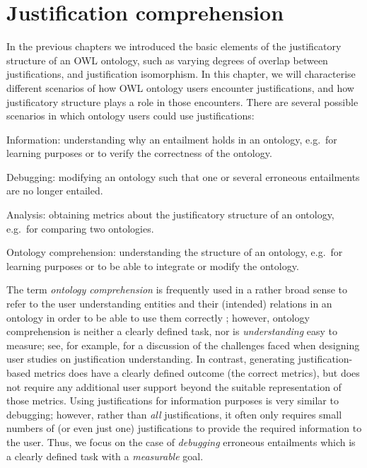 \chapter{Justification comprehension}
\label{chap:understanding}

In the previous chapters we introduced the basic elements of the justificatory structure of an OWL ontology, such as varying degrees of overlap between justifications, and justification isomorphism. In this chapter, we will characterise different scenarios of how OWL ontology users encounter justifications, and how justificatory structure plays a role in those encounters. There are several possible scenarios in which ontology users could use justifications:
\begin{compactitem}
\item Information: understanding why an entailment holds in an ontology, e.g.\ for learning purposes or to verify the correctness of the ontology.
\item Debugging: modifying an ontology such that one or several erroneous entailments are no longer entailed. 
\item Analysis: obtaining metrics about the justificatory structure of an ontology, e.g.\ for comparing two ontologies.
\item Ontology comprehension: understanding the structure of an ontology, e.g.\ for learning purposes or to be able to integrate or modify the ontology.
\end{compactitem}

The term \emph{ontology comprehension} is frequently used in a rather broad sense to refer to the user understanding entities and their (intended) relations in an ontology in order to be able to use them correctly \cite{gibson07aa,bauer09ru}; however, ontology comprehension is neither a clearly defined task, nor is \emph{understanding} easy to measure; see, for example, \cite{horridge11gj} for a discussion of the challenges faced when designing user studies on justification understanding. In contrast, generating justification-based metrics does have a clearly defined outcome (the correct metrics), but does not require any additional user support beyond the suitable representation of those metrics. Using justifications for information purposes is very similar to debugging; however, rather than \emph{all} justifications, it often only requires small numbers of (or even just one) justifications to provide the required information to the user. Thus, we focus on the case of \emph{debugging} erroneous entailments which is a clearly defined task with a \emph{measurable} goal.

